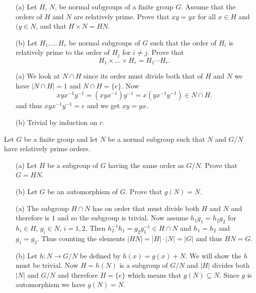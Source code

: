 \documentclass[12pt]{book}
\newcommand{\eG}{\ensuremath{\{e\}}}
\newcounter{myenumi}
\newenvironment{myenumerate}
{\begin{enumerate}
 \setcounter{enumi}{\themyenumi}
}
{\setcounter{myenumi}{\theenumi}
 \end{enumerate}}
\begin{document}
\begin{myenumerate}
\begin{excopy}
\begin{itemize}
 \item[(a)]
    Let $H$, $N$, be normal subgroups of a finite group $G$.
    Assume that the orders  of $H$ and $N$ are relatively prime.
    Prove that \(xy=yx\) for all \(x\in H\) and \((y\in N\),
    and that \(H\times N=HN\).
 \item[(b)]
    Let \(H_1,\ldots\,H_r\) be normal subgroups of $G$ such that the order
    of \(H_i\) is relatively prime to the order of \(H_j\) for \(i\neq j\).
    Prove that
    \begin{equation}
      H_1\times \ldots \times H_r = H_1\cdots H_r.
    \end{equation}
\end{itemize}
\end{excopy}

\begin{itemize}
 \item[(a)]
    We look at \(N\cap H\) since its order must divide both that
    of $H$ and $N$ we have \(|N\cap H| = 1\) and \(N\cap H = \eG\).
    Now
   \[ xyx^{-1}y^{-1} = (xyx^{-1})y^{-1} = x(yx^{-1}y^{-1}) \in N\cap H.\]
   and thus \(xyx^{-1}y^{-1} = e\) and we get \(xy=yx\).
 \item[(b)]
    Trivial by induction on $r$.
\end{itemize}


\begin{excopy}
Let $G$ be a finite group and let $N$ be a normal subgroup such that
$N$ and \(G/N\) have relatively prime orders.
 \begin{itemize}
   \item[(a)]
      Let $H$ be a subgroup of $G$ having the same order as \(G/N\).
      Prove that \(G = HN\).
   \item[(b)]
      Let $G$ be an automorphism of $G$. Prove that \(g(N) = N\).
 \end{itemize}
\end{excopy}

\begin{itemize}
 \item[(a)]
    The subgroup \(H\cap N\) has on order that must divide
    both $H$ and $N$ and therefore is $1$ and so the subgroup is trivial.
    Now assume \(h_1g_1 = h_2g_2\)
    for \(h_i\in H\), \(g_i\in N\), \(i=1,2\).
    Then \(h_2^{-1}h_1 = g_2g_1^{-1} \in H\cap N\) and
    \(h_1 = h_2\) and \(g_1 = g_2\). Thus counting the elements
    \(|HN| = |H|\cdot|N| = |G|\) and thus \(HN=G\).
 \item[(b)]
    Let \(h: N \rightarrow G/N\) be defined by \(h(x)=g(x)+N\).
    We will show the $h$ must be trivial.
    Now \(H=h(N)\) is a subgroup of \(G/N\) and \(|H|\)
    divides both \(|N|\) and \(G/N\) and therefore \(H=\eG\)
    which means that \(g(N)\subseteq N\). Since $g$ is automorphism
    we have \(g(N) = N\).
\end{itemize}


\end{myenumerate}
\end{document}

